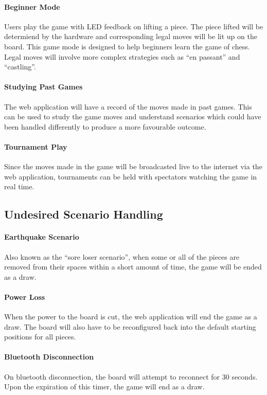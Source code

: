 \documentclass[12pt]{article}
\begin{document}
{{    \paragraph{Beginner Mode}{
        Users play the game with LED feedback on lifting a piece. The piece lifted will be determiend by the hardware and corresponding legal moves will be lit up on the board. This game
        mode is designed to help beginners learn the game of chess. Legal moves will involve more complex strategies such as ``en passant'' and ``castling''.
    }
        
    \paragraph{Studying Past Games}{
        The web application will have a record of the moves made in past games. This can be used to study the game moves and understand scenarios which could have been handled differently
        to produce a more favourable outcome.
    }
    
    \paragraph{Tournament Play}{
        Since the moves made in the game will be broadcasted live to the internet via the web application, tournaments can be held with spectators watching the game in real time.
    }
}

\subsection{Undesired Scenario Handling}{
    \paragraph{Earthquake Scenario}{
        Also known as the ``sore loser scenario'', when some or all of the pieces are removed from their spaces within a short amount of time, the game will be ended as a draw. 
    }
    
    \paragraph{Power Loss}{
        When the power to the board is cut, the web application will end the game as a draw. The board will also have to be reconfigured back into the default starting positions for all pieces.
    }
    
    \paragraph{Bluetooth Disconnection}{
        On bluetooth disconnection, the board will attempt to reconnect for 30 seconds. Upon the expiration of this timer, the game will end as a draw.
    }
    
}}
\end{document}
